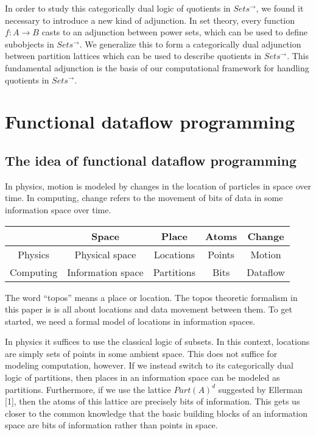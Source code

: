 \documentclass[a4paper,11pt, notitlepage]{report}
\theoremstyle{definition}
\begin{document}
In order to study this categorically dual logic of quotients in $Sets^{\to}$, we found it necessary to introduce a new kind of adjunction. In set theory, every function $f: A \to B$ casts to an adjunction between power sets, which can be used to define subobjects in $Sets^{\to}$. We generalize this to form a categorically dual adjunction between partition lattices which can be used to describe quotients in $Sets^{\to}$. This fundamental adjunction is the basis of our computational framework for handling quotients in $Sets^{\to}$.
\newpage

\chapter{Functional dataflow programming}

\section{The idea of functional dataflow programming}

In physics, motion is modeled by changes in the location of particles in space over time. In computing, change refers to the movement of bits of data in some information space over time.

\vspace{\baselineskip}

\begin{tabular}{ |c|c|c|c|c| }
\hline
& Space & Place & Atoms & Change \\
\hline
Physics & Physical space & Locations & Points & Motion \\
Computing & Information space & Partitions & Bits & Dataflow \\
\hline
\end{tabular}

\vspace{\baselineskip}

The word “topos” means a place or location. The topos theoretic formalism in this paper is is all about locations and data movement between them. To get started, we need a formal model of locations in information spaces.

In physics it suffices to use the classical logic of subsets. In this context, locations are simply sets of points in some ambient space. This does not suffice for modeling computation, however. If we instead switch to its categorically dual logic of partitions, then places in an information space can be modeled as partitions. Furthermore, if we use the lattice $Part(A)^d$ suggested by Ellerman [1], then the atoms of this lattice are precisely bits of information. This gets us closer to the common knowledge that the basic building blocks of an information space are bits of information rather than points in space.
\end{document}
